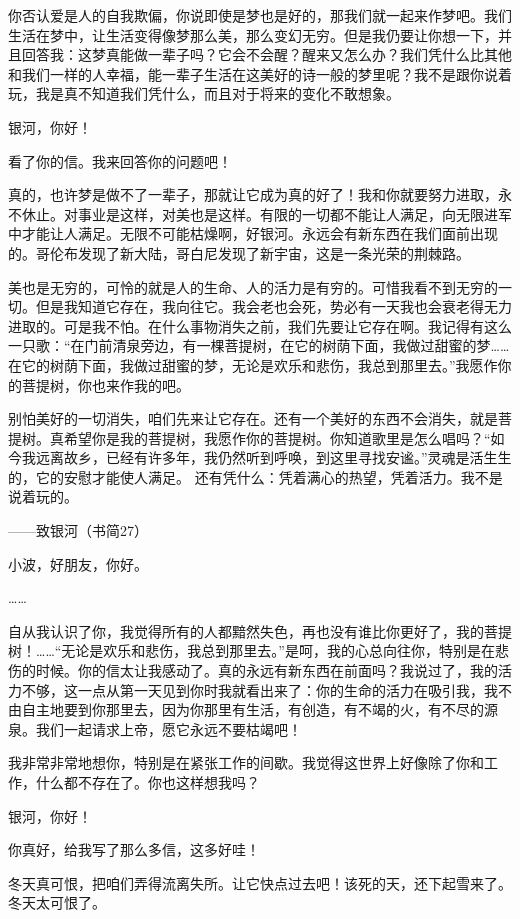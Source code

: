 你否认爱是人的自我欺偏，你说即使是梦也是好的，那我们就一起来作梦吧。我们生活在梦中，让生活变得像梦那么美，那么变幻无穷。但是我仍要让你想一下，并且回答我：这梦真能做一辈子吗？它会不会醒？醒来又怎么办？我们凭什么比其他和我们一样的人幸福，能一辈子生活在这美好的诗一般的梦里呢？我不是跟你说着玩，我是真不知道我们凭什么，而且对于将来的变化不敢想象。 

银河，你好！ 

看了你的信。我来回答你的问题吧！ 

真的，也许梦是做不了一辈子，那就让它成为真的好了！我和你就要努力进取，永不休止。对事业是这样，对美也是这样。有限的一切都不能让人满足，向无限进军中才能让人满足。无限不可能枯燥啊，好银河。永远会有新东西在我们面前出现的。哥伦布发现了新大陆，哥白尼发现了新宇宙，这是一条光荣的荆棘路。 

美也是无穷的，可怜的就是人的生命、人的活力是有穷的。可惜我看不到无穷的一切。但是我知道它存在，我向往它。我会老也会死，势必有一天我也会衰老得无力进取的。可是我不怕。在什么事物消失之前，我们先要让它存在啊。我记得有这么一只歌：“在门前清泉旁边，有一棵菩提树，在它的树荫下面，我做过甜蜜的梦……在它的树荫下面，我做过甜蜜的梦，无论是欢乐和悲伤，我总到那里去。”我愿作你的菩提树，你也来作我的吧。 

别怕美好的一切消失，咱们先来让它存在。还有一个美好的东西不会消失，就是菩提树。真希望你是我的菩提树，我愿作你的菩提树。你知道歌里是怎么唱吗？“如今我远离故乡，已经有许多年，我仍然听到呼唤，到这里寻找安谧。”灵魂是活生生的，它的安慰才能使人满足。 还有凭什么：凭着满心的热望，凭着活力。我不是说着玩的。 




——致银河（书简27） 

小波，好朋友，你好。 

…… 

自从我认识了你，我觉得所有的人都黯然失色，再也没有谁比你更好了，我的菩提树！……“无论是欢乐和悲伤，我总到那里去。”是呵，我的心总向往你，特别是在悲伤的时候。你的信太让我感动了。真的永远有新东西在前面吗？我说过了，我的活力不够，这一点从第一天见到你时我就看出来了：你的生命的活力在吸引我，我不由自主地要到你那里去，因为你那里有生活，有创造，有不竭的火，有不尽的源泉。我们一起请求上帝，愿它永远不要枯竭吧！ 

我非常非常地想你，特别是在紧张工作的间歇。我觉得这世界上好像除了你和工作，什么都不存在了。你也这样想我吗？ 

银河，你好！ 

你真好，给我写了那么多信，这多好哇！ 

冬天真可恨，把咱们弄得流离失所。让它快点过去吧！该死的天，还下起雪来了。冬天太可恨了。 


